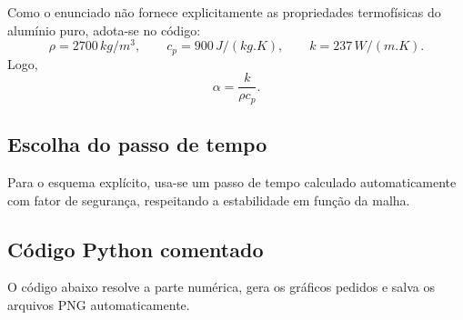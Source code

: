 \documentclass[12pt,a4paper]{article}
\begin{document}
Como o enunciado não fornece explicitamente as propriedades termofísicas do alumínio puro, adota-se no código:
\begin{equation}
\rho = 2700\,\si{kg/m^3}, \qquad c_p = 900\,\si{J/(kg.K)}, \qquad k = 237\,\si{W/(m.K)}.
\end{equation}
Logo,
\begin{equation}
\alpha = \frac{k}{\rho c_p}.
\end{equation}

\subsection*{Escolha do passo de tempo}
Para o esquema explícito, usa-se um passo de tempo calculado automaticamente com fator de segurança, respeitando a estabilidade em função da malha.

\subsection*{Código Python comentado}
O código abaixo resolve a parte numérica, gera os gráficos pedidos e salva os arquivos PNG automaticamente.
\end{document}
